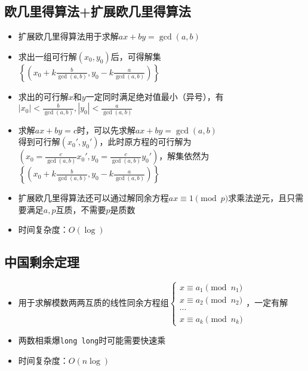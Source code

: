 \documentclass[twocolumn,a4,8pt]{article}  %
\begin{document}
	 	\subsection{欧几里得算法+扩展欧几里得算法}	 	
	 		\noindent\begin{itemize}
	 			\item 扩展欧几里得算法用于求解$ax+by=\gcd(a,b)$
	 			\item 求出一组可行解$(x_0,y_0)$后，可得解集\\ $\left\{\left(x_0+k\frac{b}{\gcd(a,b)},y_0-k\frac{a}{\gcd(a,b)}\right)\right\}$
	 			\item 求出的可行解$x$和$y$一定同时满足绝对值最小（异号），有$|x_0|<\frac{b}{\gcd(a,b)},|y_0|<\frac{a}{\gcd(a,b)}$
	 			\item 求解$ax+by=c$时，可以先求解$ax+by=\gcd(a,b)$\\ 得到可行解$(x_0',y_0')$，此时原方程的可行解为\\ $\left(x_0=\frac{c}{\gcd(a,b)}x_0',y_0=\frac{c}{\gcd(a,b)}y_0'\right)$，解集依然为\\ $\left\{\left(x_0+k\frac{b}{\gcd(a,b)},y_0-k\frac{a}{\gcd(a,b)}\right)\right\}$
	 			\item 扩展欧几里得算法还可以通过解同余方程$ax\equiv 1\pmod p$求乘法逆元，且只需要满足$a,p$互质，不需要$p$是质数
		 		\item 时间复杂度：$O(\log)$
	 		\end{itemize}
	 	 	
	
	 	\subsection{中国剩余定理}
	 		\noindent\begin{itemize}
	 			\item 用于求解模数两两互质的线性同余方程组$\begin{cases}x\equiv a_1\pmod{n_1}\\x\equiv a_2\pmod{n_2}\\\cdots\\x\equiv a_k\pmod{n_k}\end{cases}$，一定有解
	 			\item 两数相乘爆\texttt{long long}时可能需要快速乘
		 		\item 时间复杂度：$O(n\log)$
	 		\end{itemize}
	 	 	
	
\end{document}
